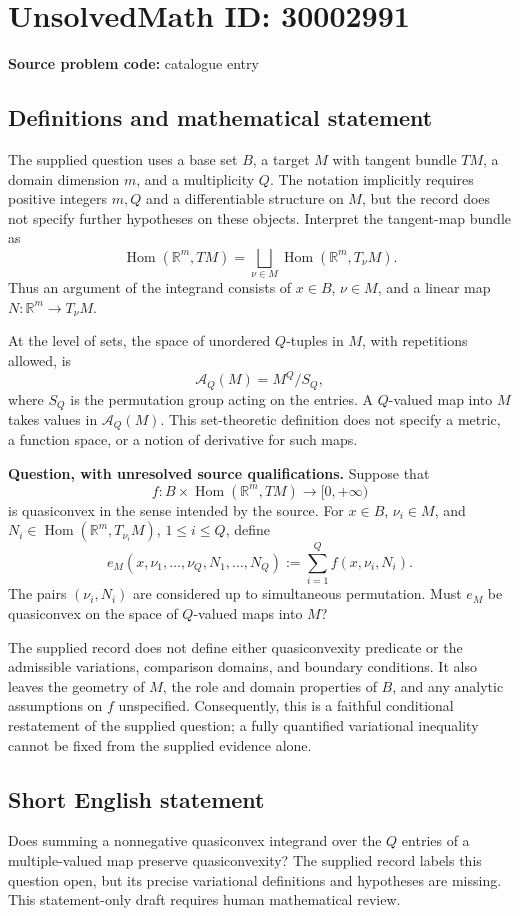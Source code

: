 \documentclass[11pt]{article}
\newcommand{\R}{\mathbb{R}}
\begin{document}
\section*{UnsolvedMath ID: 30002991}
\textbf{Source problem code:} catalogue entry
\subsection{Definitions and mathematical statement}
The supplied question uses a base set \(B\), a target \(M\) with tangent bundle \(TM\), a domain dimension \(m\), and a multiplicity \(Q\). The notation implicitly requires positive integers \(m,Q\) and a differentiable structure on \(M\), but the record does not specify further hypotheses on these objects. Interpret the tangent-map bundle as
\[
\operatorname{Hom}(\R^m,TM)
=\bigsqcup_{\nu\in M}\operatorname{Hom}(\R^m,T_\nu M).
\]
Thus an argument of the integrand consists of \(x\in B\), \(\nu\in M\), and a linear map \(N:\R^m\to T_\nu M\).

At the level of sets, the space of unordered \(Q\)-tuples in \(M\), with repetitions allowed, is
\[
\mathcal A_Q(M)=M^Q/S_Q,
\]
where \(S_Q\) is the permutation group acting on the entries. A \(Q\)-valued map into \(M\) takes values in \(\mathcal A_Q(M)\). This set-theoretic definition does not specify a metric, a function space, or a notion of derivative for such maps.

\textbf{Question, with unresolved source qualifications.} Suppose that
\[
f:B\times\operatorname{Hom}(\R^m,TM)\longrightarrow[0,+\infty)
\]
is quasiconvex in the sense intended by the source. For \(x\in B\), \(\nu_i\in M\), and \(N_i\in\operatorname{Hom}(\R^m,T_{\nu_i}M)\), \(1\leq i\leq Q\), define
\[
e_M(x,\nu_1,\ldots,\nu_Q,N_1,\ldots,N_Q)
:=\sum_{i=1}^Q f(x,\nu_i,N_i).
\]
The pairs \((\nu_i,N_i)\) are considered up to simultaneous permutation. Must \(e_M\) be quasiconvex on the space of \(Q\)-valued maps into \(M\)?

The supplied record does not define either quasiconvexity predicate or the admissible variations, comparison domains, and boundary conditions. It also leaves the geometry of \(M\), the role and domain properties of \(B\), and any analytic assumptions on \(f\) unspecified. Consequently, this is a faithful conditional restatement of the supplied question; a fully quantified variational inequality cannot be fixed from the supplied evidence alone.
\subsection{Short English statement}
Does summing a nonnegative quasiconvex integrand over the \(Q\) entries of a multiple-valued map preserve quasiconvexity? The supplied record labels this question open, but its precise variational definitions and hypotheses are missing. This statement-only draft requires human mathematical review.
\end{document}
